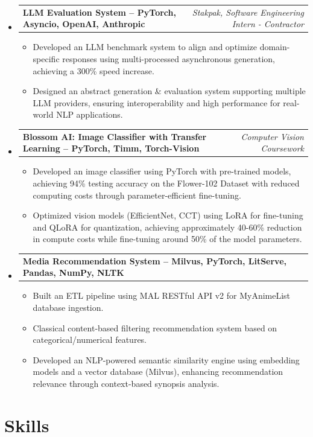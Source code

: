 \documentclass[10pt, letterpaper]{extarticle}
\makeatletter
\newcommand{\resumeItem}[1]{\item{#1}}
\newcommand{\resumeProjectHeading}[2]{
    \item
    \begin{tabular*}{\textwidth}[t]{@{}p{0.82\textwidth}@{\extracolsep{\fill}}r@{}}
       \textbf{#1} & \textit{#2} \\
    \end{tabular*}\vspace{2pt}
}
\makeatother
\begin{document}
\begin{itemize}[label={}, leftmargin=0in]
 \resumeProjectHeading{LLM Evaluation System -- PyTorch, Asyncio, OpenAI, Anthropic}{Stakpak, Software Engineering Intern - Contractor}
 \begin{itemize}[label={--}]
    \resumeItem{Developed an LLM benchmark system to align and optimize domain-specific responses using multi-processed asynchronous generation, achieving a 300\% speed increase.}
    \resumeItem{Designed an abstract generation \& evaluation system supporting multiple LLM providers, ensuring interoperability and high performance for real-world NLP applications.}
 \end{itemize}

 \resumeProjectHeading{Blossom AI: Image Classifier with Transfer Learning -- PyTorch, Timm, Torch-Vision}{Computer Vision Coursework}
 \begin{itemize}[label={--}]
    \resumeItem{Developed an image classifier using PyTorch with pre-trained models, achieving 94\% testing accuracy on the Flower-102 Dataset with reduced computing costs through parameter-efficient fine-tuning.}
    \resumeItem{Optimized vision models (EfficientNet, CCT) using LoRA for fine-tuning and QLoRA for quantization, achieving approximately 40-60\% reduction in compute costs while fine-tuning around 50\% of the model parameters.}
 \end{itemize}

 \resumeProjectHeading{Media Recommendation System -- Milvus, PyTorch, LitServe, Pandas, NumPy, NLTK}{}
 \begin{itemize}[label={--}]
    \resumeItem{Built an ETL pipeline using MAL RESTful API v2 for MyAnimeList database ingestion.}
    \resumeItem{Classical content-based filtering recommendation system based on categorical/numerical features.}
    \resumeItem{Developed an NLP-powered semantic similarity engine using embedding models and a vector database (Milvus), enhancing recommendation relevance through context-based synopsis analysis.}
 \end{itemize}

\end{itemize}

\section{Skills}
\end{document}
